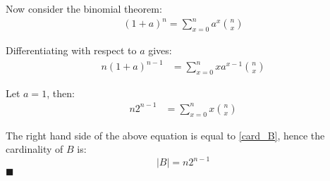 \documentclass[12pt]{article}
\newcommand{\q}{\hfill $\blacksquare$}
\newenvironment{ps}
{\begin{enumerate}[leftmargin=0em, itemindent=1.5em]}
{\end{enumerate}}
\begin{document}
\begin{ps}
    Now consider the binomial theorem: 
    \begin{align*}
        (1 + a)^n = \sum_{x=0}^n a^x \binom{n}{x}
    \end{align*}

    Differentiating with respect to \( a \) gives: 
    \begin{align*}
        n(1+a)^{n-1} &= \sum_{x = 0}^n xa^{x-1} \binom{n}{x}
    \end{align*}

    Let \( a = 1 \), then:
    \begin{align*}
        n2^{n-1} &= \sum_{x = 0}^n x \binom{n}{x}
    \end{align*}

    The right hand side of the above equation is equal to \eqref{card_B}, hence the cardinality of \( B \)
    is:
    \[
        |B| = n2^{n-1}
    \] \q

    \end{ps}
\end{document}
